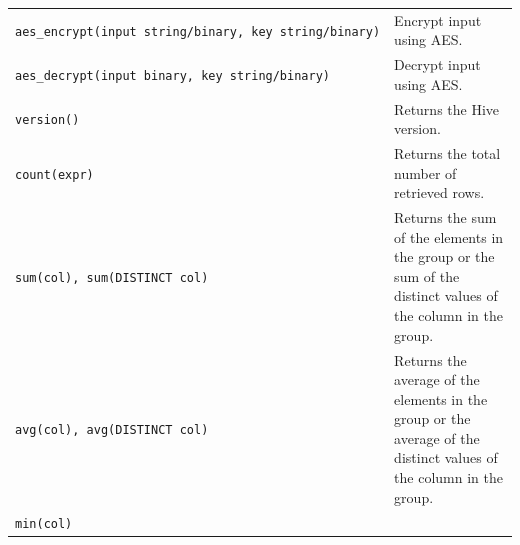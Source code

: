 \documentclass[
]{article}
\begin{document}
\begin{longtable}[]{@{}ll@{}}
\begin{minipage}[t]{0.39\columnwidth}
\texttt{aes\_encrypt(input\ string/binary,\ key\ string/binary)}\strut
\end{minipage} & \begin{minipage}[t]{0.55\columnwidth}\raggedright
Encrypt input using AES.\strut
\end{minipage}\tabularnewline
\begin{minipage}[t]{0.39\columnwidth}\raggedright
\texttt{aes\_decrypt(input\ binary,\ key\ string/binary)}\strut
\end{minipage} & \begin{minipage}[t]{0.55\columnwidth}\raggedright
Decrypt input using AES.\strut
\end{minipage}\tabularnewline
\begin{minipage}[t]{0.39\columnwidth}\raggedright
\texttt{version()}\strut
\end{minipage} & \begin{minipage}[t]{0.55\columnwidth}\raggedright
Returns the Hive version.\strut
\end{minipage}\tabularnewline
\begin{minipage}[t]{0.39\columnwidth}\raggedright
\texttt{count(expr)}\strut
\end{minipage} & \begin{minipage}[t]{0.55\columnwidth}\raggedright
Returns the total number of retrieved rows.\strut
\end{minipage}\tabularnewline
\begin{minipage}[t]{0.39\columnwidth}\raggedright
\texttt{sum(col),\ sum(DISTINCT\ col)}\strut
\end{minipage} & \begin{minipage}[t]{0.55\columnwidth}\raggedright
Returns the sum of the elements in the group or the sum of the distinct
values of the column in the group.\strut
\end{minipage}\tabularnewline
\begin{minipage}[t]{0.39\columnwidth}\raggedright
\texttt{avg(col),\ avg(DISTINCT\ col)}\strut
\end{minipage} & \begin{minipage}[t]{0.55\columnwidth}\raggedright
Returns the average of the elements in the group or the average of the
distinct values of the column in the group.\strut
\end{minipage}\tabularnewline
\begin{minipage}[t]{0.39\columnwidth}\raggedright
\texttt{min(col)}\strut
\end{minipage} & \begin{minipage}[t]{0.55\columnwidth}\raggedright

\end{minipage}
\end{longtable}
\end{document}
